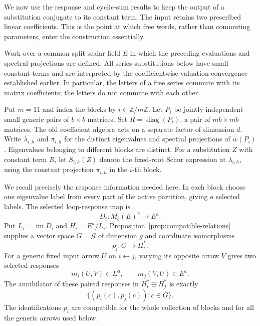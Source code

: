 \documentclass[11pt]{article}
\theoremstyle{definition}
\theoremstyle{remark}
\numberwithin{equation}{section}
\begin{document}
We now use the response and cyclic-sum results to keep the output of a
substitution conjugate to its constant term.  The input retains two prescribed
linear coefficients.  This is the point at which free words, rather than
commuting parameters, enter the construction essentially.

Work over a common split scalar field $E$ in which the preceding evaluations
and spectral projections are defined.  All series substitutions below have
small constant terms and are interpreted by the coefficientwise valuation
convergence established earlier.  In particular, the letters of a free series
commute with its matrix coefficients; the letters do not commute with each
other.

Put $m=11$ and index the blocks by $i\in\mathbb Z/m\mathbb Z$.
Let $P_i$ be jointly independent small generic pairs of $b\times b$
matrices.  Set $R=\operatorname{diag}(P_i)$, a pair of $mb\times mb$
matrices.  The old coefficient algebra acts on a separate factor of dimension
$d$.  Write $\lambda_{i,h}$ and $\pi_{i,h}$ for the distinct eigenvalues
and spectral projections of $w(P_i)$.  Eigenvalues belonging to different
blocks are distinct.  For a substitution $Z$ with constant term $R$, let
$S_{i,h}(Z)$ denote the fixed-root Schur expression at $\lambda_{i,h}$,
using the constant projection $\pi_{i,h}$ in the $i$-th block.

We recall precisely the response information needed here.  In each block
choose one eigenvalue label from every part of the active partition, giving
$a$ selected labels.  The selected loop-response map is
\[
 D_i:M_b(E)^2\longrightarrow E^a.
\]
Put $L_i=\operatorname{im}D_i$ and $H_i=E^a/L_i$.
Proposition~\ref{prop:compatible-relations} supplies a vector space
$G=\mathcal G$ of dimension $g$ and coordinate isomorphisms
\[
 p_i:G\longrightarrow H_i^*.
\]
For a generic fixed input arrow $U$ on $i\leftarrow j$, varying its
opposite arrow $V$ gives two selected responses
\[
 m_i(U,V)\in E^a,
 \qquad m_j(V,U)\in E^a.
\]
The annihilator of these paired responses in $H_i^*\oplus H_j^*$ is
exactly
\begin{equation}
 \{(p_i(c),p_j(c)):c\in G\}.
 \label{eq:correction-paired-annihilator}
\end{equation}
The identifications $p_i$ are compatible for the whole collection of blocks
and for all the generic arrows used below.
\end{document}
